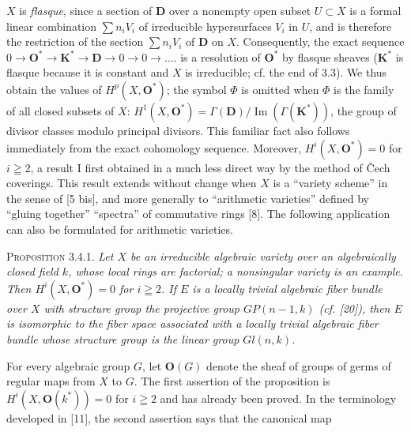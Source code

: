 \begingroup
\setlength{\abovedisplayskip}{0.5\baselineskip}
\setlength{\belowdisplayskip}{0.5\baselineskip}
\setlength{\abovedisplayshortskip}{0.35\baselineskip}
\setlength{\belowdisplayshortskip}{0.5\baselineskip}

\noindent $X$ is \textit{flasque}, since a section of $\mathbf D$ over a nonempty open
subset $U\subset X$ is a formal linear combination $\sum n_iV_i$ of
irreducible hypersurfaces $V_i$ in $U$, and is therefore the restriction of
the section $\sum n_iV_i$ of $\mathbf D$ on $X$. Consequently, the exact sequence
$0\to\mathbf O^*\to\mathbf K^*\to\mathbf D\to0\to0\to\ldots.$
is a resolution of $\mathbf O^*$ by flasque sheaves ($\mathbf K^*$ is flasque
because it is constant and $X$ is irreducible; cf. the end of 3.3). We thus
obtain the values of $H^p(X,\mathbf O^*)$; the symbol $\Phi$ is omitted when
$\Phi$ is the family of all closed subsets of $X$:
$H^1(X,\mathbf O^*)=\Gamma(\mathbf D)/\operatorname{Im}(\Gamma(\mathbf K^*))$,
the group of divisor classes modulo principal divisors. This familiar fact
also follows immediately from the exact cohomology sequence. Moreover,
$H^i(X,\mathbf O^*)=0$ for $i\geqq2$, a result I first obtained in a much less
direct way by the method of Čech coverings. This result extends without
change when $X$ is a ``variety scheme'' in the sense of [5 bis], and more
generally to ``arithmetic varieties'' defined by ``gluing together'' ``spectra''
of commutative rings [8]. The following application can also be formulated
for arithmetic varieties.

\indent\textsc{Proposition 3.4.1.} \textit{Let $X$ be an irreducible algebraic
variety over an algebraically closed field $k$, whose local rings are
factorial; a nonsingular variety is an example. Then
$H^i(X,\mathbf O^*)=0$ for $i\geqq2$. If $E$ is a locally trivial algebraic
fiber bundle over $X$ with structure group the projective group
$\mathit{GP}(n-1,k)$ \textup{(}cf. \textup{[20])}, then $E$ is isomorphic to the fiber
space associated with a locally trivial algebraic fiber bundle whose
structure group is the linear group $\mathit{Gl}(n,k)$.}

For every algebraic group $G$, let $\mathbf O(G)$ denote the sheaf of groups
of germs of regular maps from $X$ to $G$. The first assertion of the
proposition is $H^i(X,\mathbf O(k^*))=0$ for $i\geqq2$ and has already been
proved. In the terminology developed in [11], the second assertion says that
the canonical map


